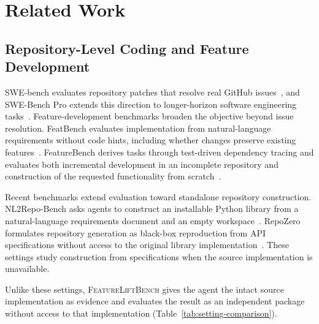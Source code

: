 \documentclass[acmsmall,screen,review,anonymous]{acmart}
\newcommand{\flb}{\textsc{FeatureLiftBench}\xspace}
\begin{document}
\section{Related Work}
\label{sec:related-work}

\subsection{Repository-Level Coding and Feature Development}

SWE-bench evaluates repository patches that resolve real GitHub
issues~\cite{jimenez2024swebench}, and SWE-Bench Pro extends this direction to
longer-horizon software engineering tasks~\cite{deng2025swebenchpro}.
Feature-development benchmarks broaden the objective beyond issue resolution.
FeatBench evaluates implementation from natural-language requirements without
code hints, including whether changes preserve existing
features~\cite{chen2026featbench}. FeatureBench derives tasks through test-driven
dependency tracing and evaluates both incremental development in an incomplete
repository and construction of the requested functionality from
scratch~\cite{zhou2026featurebench}.

Recent benchmarks extend evaluation toward standalone repository construction.
NL2Repo-Bench asks agents to construct an installable Python library from a
natural-language requirements document and an empty
workspace~\cite{ding2026nl2repo}. RepoZero formulates repository generation as
black-box reproduction from API specifications without access to the original
library implementation~\cite{zhang2026repozero}. These settings study construction
from specifications when the source implementation is unavailable.

Unlike these settings, \flb gives the agent the intact source implementation as
evidence and evaluates the result as an independent package without access to
that implementation (Table~\ref{tab:setting-comparison}).

\end{document}

